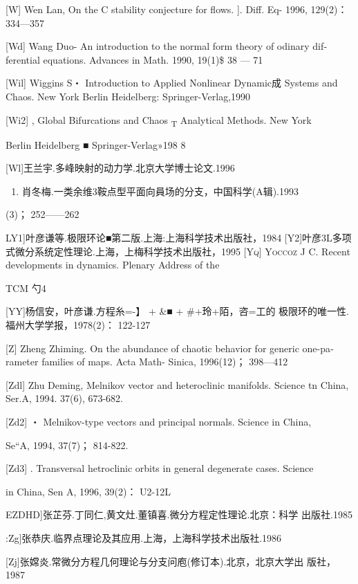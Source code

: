 {[}W{]} Wen Lan, On the C stability conjecture for flows. {]}. Diff. Eq-
1996, 129(2)： 334---357

{[}Wd{]} Wang Duo- An introduction to the normal form theory of odinary
dif­ferential equations. Advances in Math. 1990, 19(1)\$ 38 --- 71

{[}Wil{]} Wiggins S・ Introduction to Applied Nonlinear Dynamic成
Systems and Chaos. New York Berlin Heidelberg: Springer-Verlag,1990

{[}Wi2{]} , Global Bifurcations and Chaos \textsubscript{T} Analytical
Methods. New York

Berlin Heidelberg ■ Springer-Verlag»198 8

{[}Wl{]}王兰宇.多峰映射的动力学.北京大学博士论文.1996

\begin{enumerate}
\def\labelenumi{\Roman{enumi}.}
\setcounter{enumi}{9}
\item
  肖冬梅.一类余维3鞍点型平面向員场的分支，中国科学(A辑).1993
\end{enumerate}

(3)； 252------262

LY1{]}叶彦谦等.极限环论■第二版.上海:上海科学技术出版社，1984
{[}Y2{]}叶彦3L多项式微分系统定性理论.上海，上梅科学技术出版社，1995
\textsc{{[}Yq{]} Yoccoz} J C. Recent developments in dynamics. Plenary
Address of the

TCM 勺4

{[}YY{]}杨信安，叶彦谦.方程糸=-】 + \&■ + \#+玲+陌，咨=工的
极限环的唯一性.福州大学学报，1978(2)： 122-127

{[}Z{]} Zheng Zhiming. On the abundance of chaotic behavior for generic
one-pa­rameter families of maps. Acta Math- Sinica, 1996(12)； 398---412

{[}Zdl{]} Zhu Deming, Melnikov vector and heteroclinic manifolds.
Science tn China, Ser.A, 1994. 37(6), 673-682.

{[}Zd2{]} ・ Melnikov-type vectors and principal normals. Science in
China,

Se``A, 1994, 37(7)； 814-822.

{[}Zd3{]} . Transversal hetroclinic orbits in general degenerate cases.
Science

in China, Sen A, 1996, 39(2)： U2-12L

EZDHD{]}张芷芬.丁同仁,黄文灶.董镇喜.微分方程定性理论.北京：科学
出版社.1985

:Zg{]}张恭庆.临界点理论及其应用.上海，上海科学技术出版社.1986

{[}Zj{]}张嫦炎.常微分方程几何理论与分支问庖(修订本).北京，北京大学出
版社，1987

